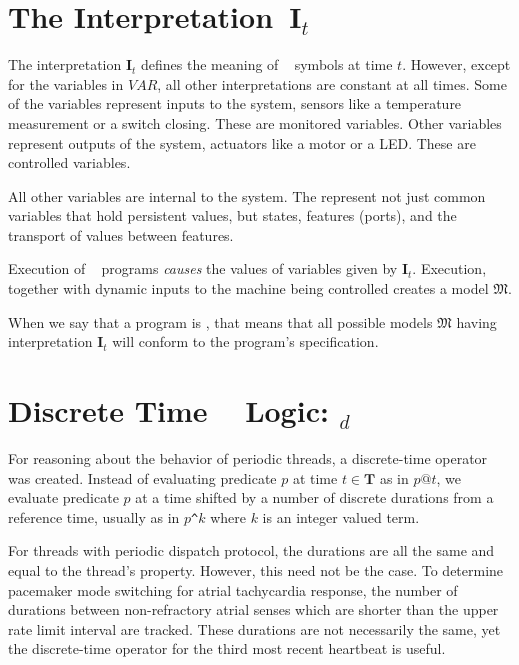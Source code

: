 \section{The Interpretation~$\mathbf{I}_{t}$}\label{sec:interpretation}
 
The interpretation $\mathbf{I}_{t}$ defines the meaning of \logicid~ symbols at time $t$.  However, except for the variables in $VAR$, all other interpretations are constant at all times.  Some of the variables represent inputs to the system, sensors like a temperature measurement or a switch closing.  These are monitored variables.  Other variables represent outputs of the system, actuators like a motor or a LED.  These are controlled variables.

All other variables are internal to the system.  The represent not just common variables that hold persistent values, but states, features (ports), and the transport of values between features.  

Execution of \lang~ programs \emph{causes} the values of variables given by $\mathbf{I}_{t}$.  Execution, together with dynamic inputs to the machine being controlled creates a model $\mathfrak{M}$.

When we say that a program is , that means that all possible models  $\mathfrak{M}$ having interpretation $\mathbf{I}_{t}$ will conform to the program's specification. 
 
 
 
 
 \section{Discrete Time \lang~ Logic: \logicid$_d$}\label{sec:BLd}
 
 For reasoning about the behavior of periodic threads, a discrete-time operator was created.  Instead of evaluating predicate $p$ at time $t \in \mathbf{T}$ as in $p@t$, we evaluate predicate $p$ at a time shifted by a number of discrete durations from a reference time, usually  as in $p$\texttt{\^}$k$ where $k$ is an integer valued term.
 
 For threads with periodic dispatch protocol, the durations are all the same and equal to the thread's  property.  However, this need not be the case.  To determine pacemaker mode switching for atrial tachycardia response, the number of durations between non-refractory atrial senses which are shorter than the upper rate limit interval are tracked.  These durations are not necessarily the same, yet the discrete-time operator for the third most recent heartbeat is useful.
 
